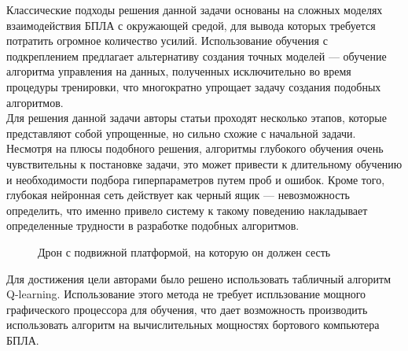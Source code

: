 \documentclass[12 pt, a4paper]{article}
\theoremstyle{definition}
\theoremstyle{plain}
\theoremstyle{remark}
\begin{document}
Классические подходы решения данной задачи основаны на сложных моделях взаимодействия БПЛА с окружающей средой, для вывода которых требуется потратить огромное количество усилий. Использование обучения с подкреплением предлагает альтернативу создания точных моделей — обучение алгоритма управления на данных, полученных исключительно во время процедуры тренировки, что многократно упрощает задачу создания подобных алгоритмов. \\

Для решения данной задачи авторы статьи проходят несколько этапов, которые представляют собой упрощенные, но сильно схожие с начальной задачи. \\

Несмотря на плюсы подобного решения, алгоритмы глубокого обучения очень чувствительны к постановке задачи, это может привести к длительному обучению и необходимости подбора гиперпараметров путем проб и ошибок. Кроме того, глубокая нейронная сеть действует как черный ящик — невозможность определить, что именно привело систему к такому поведению накладывает определенные трудности в разработке подобных алгоритмов. \\

\begin{figure}[h]
	           \caption{Дрон с подвижной платформой, на которую он должен сесть}
		
\label{ris:6}
\end{figure}
Для достижения цели авторами было решено использовать табличный алгоритм Q-learning. Использование этого метода не требует испльзование мощного графического процессора для обучения, что дает возможность производить использовать алгоритм на вычислительных мощностях бортового компьютера БПЛА. \\
\end{document}
